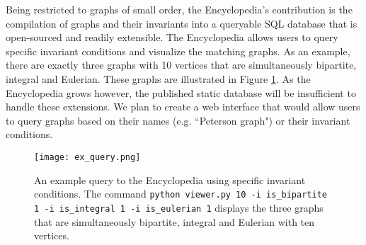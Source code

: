 \documentclass[12pt]{article}
\begin{document}
Being restricted to graphs of small order, the Encyclopedia's contribution is the compilation of graphs and their invariants into a queryable SQL database that is open-sourced and readily extensible. 
The Encyclopedia allows users to query specific invariant conditions and visualize the matching graphs.
As an example, there are exactly three graphs with 10 vertices that are simultaneously bipartite, integral and Eulerian. 
These graphs are illustrated in Figure \ref{fig:examplequery}.
As the Encyclopedia grows however, the published static database will be insufficient to handle these extensions.
We plan to create a web interface that would allow users to query graphs based on their names (e.g. ``Peterson graph") or their invariant conditions.

\begin{figure}[p]
\begin{center}
  \texttt{[image: ex\_query.png]}
\end{center}
  \caption{
    An example query to the Encyclopedia using specific invariant conditions. 
    The command \texttt{python viewer.py 10 -i is\_bipartite 1 -i is\_integral 1 -i is\_eulerian 1} displays the three graphs that are simultaneously bipartite, integral and Eulerian with ten vertices. 
  }
  \label{fig:examplequery}
\end{figure}


\clearpage %






\newpage %
\end{document}
